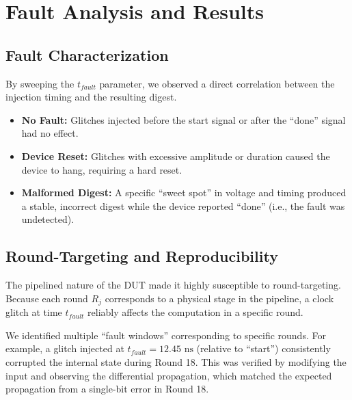 \documentclass[11pt, a4paper]{article}
\begin{document}
\section{Fault Analysis and Results}
\subsection{Fault Characterization}
By sweeping the $t_{fault}$ parameter, we observed a direct correlation between the injection timing and the resulting digest.
\begin{itemize}
    \item \textbf{No Fault:} Glitches injected before the start signal or after the ``done'' signal had no effect.
    \item \textbf{Device Reset:} Glitches with excessive amplitude or duration caused the device to hang, requiring a hard reset.
    \item \textbf{Malformed Digest:} A specific ``sweet spot'' in voltage and timing produced a stable, incorrect digest while the device reported ``done'' (i.e., the fault was undetected).
\end{itemize}

\subsection{Round-Targeting and Reproducibility}
The pipelined nature of the DUT made it highly susceptible to round-targeting. Because each round $R_j$ corresponds to a physical stage in the pipeline, a clock glitch at time $t_{fault}$ reliably affects the computation in a specific round.

We identified multiple ``fault windows'' corresponding to specific rounds. For example, a glitch injected at $t_{fault} = 12.45 \text{ ns}$ (relative to ``start'') consistently corrupted the internal state during Round 18. This was verified by modifying the input and observing the differential propagation, which matched the expected propagation from a single-bit error in Round 18.
\end{document}
